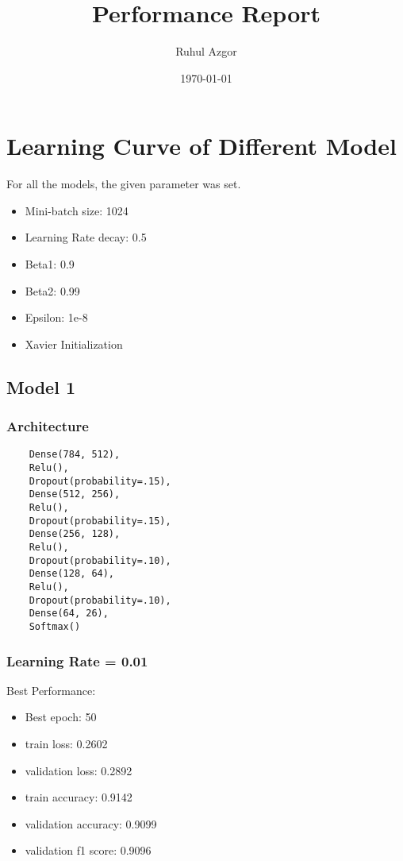 \documentclass{article}
\title{Performance Report}
\author{Ruhul Azgor}
\date{\today}
\begin{document}
\maketitle

\section{Learning Curve of Different Model}
For all the models, the given parameter was set.
\begin{itemize}
    \item Mini-batch size: 1024
    \item Learning Rate decay: 0.5
    \item Beta1: 0.9
    \item Beta2: 0.99
    \item Epsilon: 1e-8
    \item Xavier Initialization
\end{itemize}
\subsection{Model 1}
\subsubsection{Architecture}
\begin{verbatim}
    Dense(784, 512),
    Relu(),
    Dropout(probability=.15),
    Dense(512, 256),
    Relu(),
    Dropout(probability=.15),
    Dense(256, 128),
    Relu(),
    Dropout(probability=.10),
    Dense(128, 64),
    Relu(),
    Dropout(probability=.10),
    Dense(64, 26),
    Softmax()
\end{verbatim}
\subsubsection{Learning Rate = 0.01}
Best Performance:
\begin{itemize}
    \item Best epoch: 50
    \item train loss: 0.2602
    \item validation loss: 0.2892
    \item train accuracy: 0.9142
    \item validation accuracy: 0.9099
    \item validation f1 score: 0.9096
\end{itemize}
\end{document}
